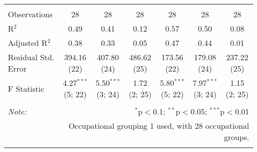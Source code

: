 \begin{sidewaystable}[!htbp]
\begin{tabular}{@{\extracolsep{0pt}}lcccccc}
  & & & & & & \\ 
\hline \\[-1.8ex] 
Observations & 28 & 28 & 28 & 28 & 28 & 28 \\ 
R$^{2}$ & 0.49 & 0.41 & 0.12 & 0.57 & 0.50 & 0.08 \\ 
Adjusted R$^{2}$ & 0.38 & 0.33 & 0.05 & 0.47 & 0.44 & 0.01 \\ 
Residual Std. Error & 394.16 (22) & 407.80 (24) & 486.62 (25) & 173.56 (22) & 179.08 (24) & 237.22 (25) \\ 
F Statistic & 4.27$^{***}$ (5; 22) & 5.50$^{***}$ (3; 24) & 1.72 (2; 25) & 5.80$^{***}$ (5; 22) & 7.97$^{***}$ (3; 24) & 1.15 (2; 25) \\ 
\hline 
\hline \\[-1.8ex] 
\textit{Note:}  & \multicolumn{6}{r}{$^{*}$p$<$0.1; $^{**}$p$<$0.05; $^{***}$p$<$0.01} \\ 
 & \multicolumn{6}{r}{Occupational grouping 1 used, with 28 occupational groups.} \\ 
\normalsize 
\end{tabular} 
\end{sidewaystable} 


